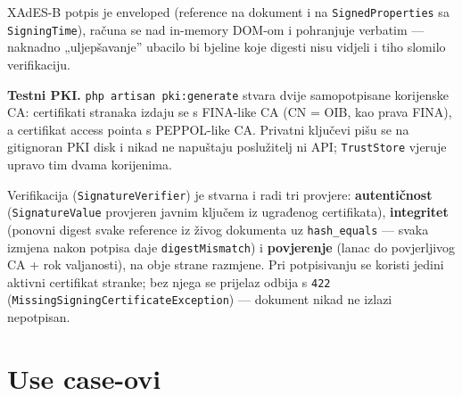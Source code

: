 \documentclass[11pt,a4paper]{article}
\begin{document}
XAdES-B potpis je enveloped (reference na dokument i na \texttt{SignedProperties} sa
\texttt{SigningTime}), računa se nad in-memory DOM-om i pohranjuje verbatim — naknadno
„uljepšavanje” ubacilo bi bjeline koje digesti nisu vidjeli i tiho slomilo verifikaciju.

\textbf{Testni PKI.} \texttt{php artisan pki:generate} stvara dvije samopotpisane korijenske CA:
certifikati stranaka izdaju se s FINA-like CA (CN = OIB, kao prava FINA), a certifikat
access pointa s PEPPOL-like CA. Privatni ključevi pišu se na gitignoran PKI disk i nikad
ne napuštaju poslužitelj ni API; \texttt{TrustStore} vjeruje upravo tim dvama korijenima.

\begin{center}
\end{center}

Verifikacija (\texttt{SignatureVerifier}) je stvarna i radi tri provjere:
\textbf{autentičnost} (\texttt{SignatureValue} provjeren javnim ključem iz ugrađenog certifikata),
\textbf{integritet} (ponovni digest svake reference iz živog dokumenta uz \texttt{hash\_equals} — svaka
izmjena nakon potpisa daje \texttt{digestMismatch}) i \textbf{povjerenje} (lanac do povjerljivog CA +
rok valjanosti), na obje strane razmjene. Pri potpisivanju se koristi jedini aktivni
certifikat stranke; bez njega se prijelaz odbija s \texttt{422}
(\texttt{MissingSigningCertificateException}) — dokument nikad ne izlazi nepotpisan.

\section{Use case-ovi}
\end{document}
